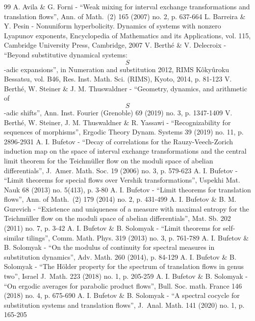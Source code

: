 \documentclass[10pt]{amsart}
\theoremstyle{plain}
\theoremstyle{definition}
\begin{document}
\begin{thebibliography}{99}
 A. Avila \& G. Forni - “Weak mixing for interval exchange transformations and translation flows”, Ann. of Math. (2) 165 (2007) no. 2, p. 637-664
 L. Barreira \& Y. Pesin - Nonuniform hyperbolicity. Dynamics of systems with nonzero Lyapunov exponents, Encyclopedia of Mathematics and its Applications, vol. 115, Cambridge University Press, Cambridge, 2007
 V. Berthé \& V. Delecroix - “Beyond substitutive dynamical systems: $$S$$-adic expansions”, in Numeration and substitution 2012, RIMS Kôkyûroku Bessatsu, vol. B46, Res. Inst. Math. Sci. (RIMS), Kyoto, 2014, p. 81-123
 V. Berthé, W. Steiner \& J. M. Thuswaldner - “Geometry, dynamics, and arithmetic of $$S$$-adic shifts”, Ann. Inst. Fourier (Grenoble) 69 (2019) no. 3, p. 1347-1409
 V. Berthé, W. Steiner, J. M. Thuswaldner \& R. Yassawi - “Recognizability for sequences of morphisms”, Ergodic Theory Dynam. Systems 39 (2019) no. 11, p. 2896-2931
 A. I. Bufetov - “Decay of correlations for the Rauzy-Veech-Zorich induction map on the space of interval exchange transformations and the central limit theorem for the Teichmüller flow on the moduli space of abelian differentials”, J. Amer. Math. Soc. 19 (2006) no. 3, p. 579-623
 A. I. Bufetov - “Limit theorems for special flows over Vershik transformations”, Uspekhi Mat. Nauk 68 (2013) no. 5(413), p. 3-80
 A. I. Bufetov - “Limit theorems for translation flows”, Ann. of Math. (2) 179 (2014) no. 2, p. 431-499
 A. I. Bufetov \& B. M. Gurevich - “Existence and uniqueness of a measure with maximal entropy for the Teichmüller flow on the moduli space of abelian differentials”, Mat. Sb. 202 (2011) no. 7, p. 3-42
 A. I. Bufetov \& B. Solomyak - “Limit theorems for self-similar tilings”, Comm. Math. Phys. 319 (2013) no. 3, p. 761-789
 A. I. Bufetov \& B. Solomyak - “On the modulus of continuity for spectral measures in substitution dynamics”, Adv. Math. 260 (2014), p. 84-129
 A. I. Bufetov \& B. Solomyak - “The Hölder property for the spectrum of translation flows in genus two”, Israel J. Math. 223 (2018) no. 1, p. 205-259
 A. I. Bufetov \& B. Solomyak - “On ergodic averages for parabolic product flows”, Bull. Soc. math. France 146 (2018) no. 4, p. 675-690
 A. I. Bufetov \& B. Solomyak - “A spectral cocycle for substitution systems and translation flows”, J. Anal. Math. 141 (2020) no. 1, p. 165-205

\end{thebibliography}
\end{document}
